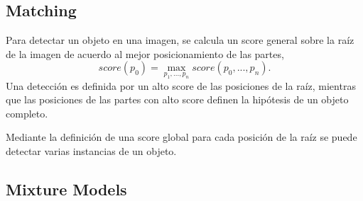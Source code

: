 \subsection{Matching}
\label{subsec:matching}
Para detectar un objeto en una imagen, se calcula un score general sobre la raíz de la imagen de acuerdo al mejor posicionamiento de las partes, 
\begin{equation}
	score(p_{0}) = \max_{p_{1}, ..., p_{n}} score(p_{0}, ..., p_{n}).
\end{equation} 
Una detección es definida por un alto score de las posiciones de la raíz, mientras que las posiciones de las partes con alto score definen la hipótesis de un objeto completo.

Mediante la definición de una score global para cada posición de la raíz se puede detectar varias instancias de un objeto.

\subsection{Mixture Models}
\label{subsec:mm}